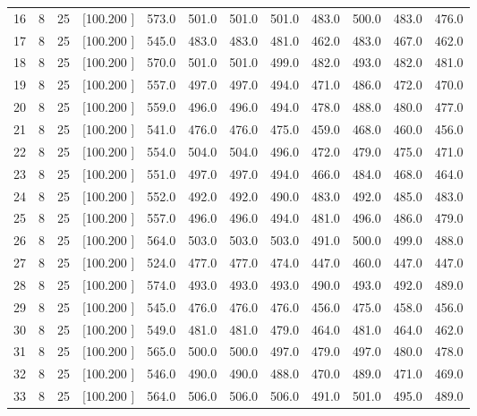 \documentclass[12pt,a4paper]{article}
\begin{document}
\begin{center}
{\begin{tabular}{r r r r r r r r r r r r}
  16&  8& 25&[100.200   ]&   573.0&   501.0&   501.0&   501.0&   483.0&   500.0&   483.0&   476.0\\[-0.02in]
  17&  8& 25&[100.200   ]&   545.0&   483.0&   483.0&   481.0&   462.0&   483.0&   467.0&   462.0\\[-0.02in]
  18&  8& 25&[100.200   ]&   570.0&   501.0&   501.0&   499.0&   482.0&   493.0&   482.0&   481.0\\[-0.02in]
  19&  8& 25&[100.200   ]&   557.0&   497.0&   497.0&   494.0&   471.0&   486.0&   472.0&   470.0\\[-0.02in]
  20&  8& 25&[100.200   ]&   559.0&   496.0&   496.0&   494.0&   478.0&   488.0&   480.0&   477.0\\[-0.02in]
  21&  8& 25&[100.200   ]&   541.0&   476.0&   476.0&   475.0&   459.0&   468.0&   460.0&   456.0\\[-0.02in]
  22&  8& 25&[100.200   ]&   554.0&   504.0&   504.0&   496.0&   472.0&   479.0&   475.0&   471.0\\[-0.02in]
  23&  8& 25&[100.200   ]&   551.0&   497.0&   497.0&   494.0&   466.0&   484.0&   468.0&   464.0\\[-0.02in]
  24&  8& 25&[100.200   ]&   552.0&   492.0&   492.0&   490.0&   483.0&   492.0&   485.0&   483.0\\[-0.02in]
  25&  8& 25&[100.200   ]&   557.0&   496.0&   496.0&   494.0&   481.0&   496.0&   486.0&   479.0\\[-0.02in]
  26&  8& 25&[100.200   ]&   564.0&   503.0&   503.0&   503.0&   491.0&   500.0&   499.0&   488.0\\[-0.02in]
  27&  8& 25&[100.200   ]&   524.0&   477.0&   477.0&   474.0&   447.0&   460.0&   447.0&   447.0\\[-0.02in]
  28&  8& 25&[100.200   ]&   574.0&   493.0&   493.0&   493.0&   490.0&   493.0&   492.0&   489.0\\[-0.02in]
  29&  8& 25&[100.200   ]&   545.0&   476.0&   476.0&   476.0&   456.0&   475.0&   458.0&   456.0\\[-0.02in]
  30&  8& 25&[100.200   ]&   549.0&   481.0&   481.0&   479.0&   464.0&   481.0&   464.0&   462.0\\[-0.02in]
  31&  8& 25&[100.200   ]&   565.0&   500.0&   500.0&   497.0&   479.0&   497.0&   480.0&   478.0\\[-0.02in]
  32&  8& 25&[100.200   ]&   546.0&   490.0&   490.0&   488.0&   470.0&   489.0&   471.0&   469.0\\[-0.02in]
  33&  8& 25&[100.200   ]&   564.0&   506.0&   506.0&   506.0&   491.0&   501.0&   495.0&   489.0\\[-0.02in]

\end{tabular}}
\end{center}
\end{document}
